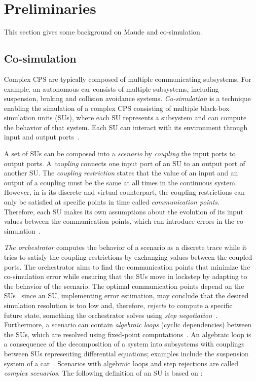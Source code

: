 \section{Preliminaries}\label{sc:background}
This section gives some background on Maude and co-simulation.



\subsection{Co-simulation}
Complex CPS are typically composed of multiple communicating subsystems.
For example, an autonomous car consists of multiple subsystems, including suspension, braking and collision avoidance systems. 
\emph{Co-simulation} is a technique enabling the simulation of a complex CPS consisting of multiple black-box simulation units (SUs), where each SU represents a subsystem and can compute the behavior of that system.
Each SU can interact with its environment through input and output ports~\cite{Gomes2019a,Kubler2000}.

A set of SUs can be composed into a \emph{scenario} by \emph{coupling} the input ports to output ports. 
A \emph{coupling} connects one input port of an SU to an output port of another SU.
The \emph{coupling restriction} states that the value of an input and an output of a coupling must be the same at all times in the continuous system.
However, in is its discrete and virtual counterpart, the coupling restrictions can only be satisfied at specific points in time called \emph{communication points}. 
Therefore, each SU makes its own assumptions about the evolution of its input values between the communication points, which can introduce errors in the co-simulation~\cite{Arnold2014}.

\emph{The orchestrator} computes the behavior of a scenario as a discrete trace while it tries to satisfy the coupling restrictions by exchanging values between the coupled ports. 
The orchestrator aims to find the communication points that minimize the co-simulation error while ensuring that the SUs move in lockstep by adapting to the behavior of the scenario.
The optimal communication points depend on the SUs~\cite{Gomes2019,Oakes2021,Gomes2018f,Schweizer2015c,Gomes2018a}
since an SU, implementing error estimation, may conclude that the desired simulation resolution is too low and, therefore, \emph{rejects} to compute a specific future state, something the orchestrator solves using \emph{step negotiation}~\cite{thrane2021}.
Furthermore, a scenario can contain \emph{algebraic loops} (cyclic dependencies) between the SUs, which are resolved using fixed-point computations~\cite{Kubler2000,Oakes2021,thrane2021}.
An algebraic loop is a consequence of the decomposition of a system into subsystems with couplings between SUs representing differential equations; examples include the suspension system of a car~\cite{thranefmi-based2020}.
Scenarios with algebraic loops and step rejections are called \emph{complex scenarios}.
The following definition of an SU is based on \cite{Broman2013,Gomes2019c,thrane2021}:

